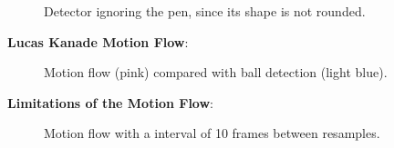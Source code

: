 \documentclass{sciposter}
\begin{document}
\begin{multicols}{3}
\begin{figure}[!h]
	\centering
			\setlength{\fboxsep}{1pt}
			\setlength{\fboxrule}{1pt}
	\caption{Detector ignoring the pen, since its shape is not rounded.}
	\label{fig:yes_hough}
\end{figure}

\textbf{Lucas Kanade Motion Flow}:

\begin{figure}[!h]
	\centering
			\setlength{\fboxsep}{1pt}
			\setlength{\fboxrule}{1pt}
	\caption{Motion flow (pink) compared with ball detection (light blue).}
	\label{fig:motion}
\end{figure}

\textbf{Limitations of the Motion Flow}:

\begin{figure}[!h]
	\centering
			\setlength{\fboxsep}{1pt}
			\setlength{\fboxrule}{1pt}
	\caption{Motion flow with a interval of 10 frames between resamples.}
	\label{fig:motion_10}
\end{figure}


\end{multicols}
\end{document}
